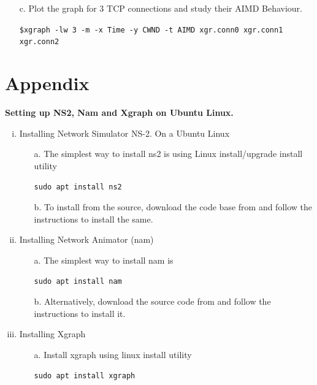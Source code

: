 \begin{multicols}{2}
\begin{itemize}
\item[c.] Plot the graph for 3 TCP connections and study their AIMD Behaviour.

\texttt{\$xgraph -lw 3 -m -x Time -y CWND -t AIMD xgr.conn0 xgr.conn1 xgr.conn2}

\end{itemize}

\section*{Appendix}

\noindent
\textbf{Setting up NS2, Nam and Xgraph on Ubuntu Linux.}

\begin{enumerate}[i.]

\item Installing Network Simulator NS-2. On a Ubuntu Linux

  \begin{itemize}
   \item[a.] The simplest way to install ns2 is using Linux install/upgrade install utility
   
   \texttt{sudo apt install ns2}

  \item[b.] To install from the source, download the code base from \cite{art2-key09} and follow the instructions to install the same.
  \end{itemize}

\item Installing Network Animator (nam)
      
      \begin{itemize}
   \item[a.] The simplest way to install nam is
   
   \texttt{sudo apt install nam}
   
   \item[b.] Alternatively, download the source code from \cite{art2-key10} and follow the instructions to install it.
   
   \end{itemize}

\item Installing Xgraph


\begin{itemize}
   \item[a.] Install xgraph \cite{art2-key11} \cite{art2-key15} using linux install utility
   
   \texttt{sudo apt install xgraph}
   

\end{itemize}
\end{enumerate}
\end{multicols}

